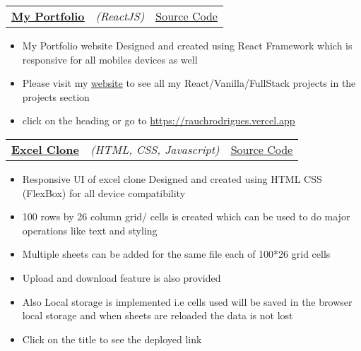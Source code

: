 \documentclass[a4paper,11pt]{article}
\makeatletter
\newcommand{\resumeItem}[1]{
  \item\small{#1}
}
\newcommand{\resumeItemListStart}{\begin{itemize}[rightmargin=0.11in]}
\newcommand{\resumeItemListEnd}{\end{itemize}}
\newcommand{\resumeTrioHeading}[3]{
  \item\small{
    \begin{tabular*}{0.96\textwidth}[t]{
      l@{\extracolsep{\fill}}c@{\extracolsep{\fill}}r
    }
      \textbf{#1} & \textit{#2} & #3
    \end{tabular*}
  }
}
\makeatother
\begin{document}
                    \resumeTrioHeading{\href{https://rauch-rodrigues.netlify.app/}{\uline{My Portfolio}}}{(ReactJS) }{\href{https://github.com/rauchrods/My-Portfolio}{\uline{Source Code}}}
      \resumeItemListStart{}
        \resumeItem{My Portfolio website Designed and created using React Framework which is responsive for all mobiles devices as well}
        \resumeItem{Please visit my \href{https://rauchrodrigues.vercel.app}{\uline{website}} to see all my React/Vanilla/FullStack projects in the projects section}
        \resumeItem{click on the heading or go to \href{https://rauchrodrigues.vercel.app}{https://rauchrodrigues.vercel.app}}
        
      \resumeItemListEnd{}




        

      

                   \resumeTrioHeading{\href{https://rauchrods.github.io/Excel-Clone/}{\uline{Excel Clone}}}{(HTML, CSS, Javascript) }{\href{https://github.com/rauchrods/Excel-Clone}{\uline{Source Code}}}
      \resumeItemListStart{}
        \resumeItem{Responsive UI of excel clone Designed and created using HTML CSS (FlexBox) for all device compatibility}
        \resumeItem{100 rows by 26 column grid/ cells is created which can be used to do major operations like text and styling }
        \resumeItem{Multiple sheets can be added for the same file each of 100*26 grid cells}
        \resumeItem{Upload and download feature is also provided}
        \resumeItem{Also Local storage is implemented i.e cells used will be saved in the browser local storage and when sheets are reloaded the data is not lost}
        \resumeItem{Click on the title to see the deployed link}
      \resumeItemListEnd{}
\end{document}
